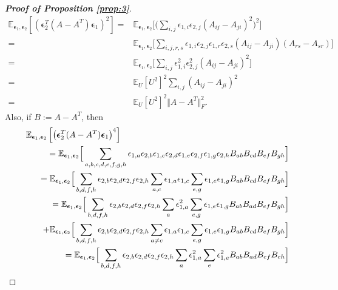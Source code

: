 \documentclass{article}
\theoremstyle{definition}
\theoremstyle{remark}
\begin{document}
	\begin{proof}[\textbf{Proof of Proposition \ref{prop:3}}]
		\begin{align*}
		\mathbb{E}_{\bm{\epsilon}_{1},\bm{\epsilon}_{2}}\left[\left(\bm{\epsilon}_{2}^{T}(A-A^{T})\bm{\epsilon}_{1}\right)^{2}\right]=&\mathbb{E}_{\bm{\epsilon}_{1},\bm{\epsilon}_{2}}\Big[\big(\sum_{i,j}{\epsilon}_{1,i}{\epsilon}_{2,j}(A_{ij}-A_{ji})^{2}\big)^{2}\Big]\\
		=&\mathbb{E}_{\bm{\epsilon}_{1},\bm{\epsilon}_{2}}\Big[\sum_{i,j,r,s}{\epsilon}_{1,i}{\epsilon}_{2,j}{\epsilon}_{1,r}{\epsilon}_{2,s}(A_{ij}-A_{ji})(A_{rs}-A_{sr})\Big]\\
		=&\mathbb{E}_{\bm{\epsilon}_{1},\bm{\epsilon}_{2}}\Big[\sum_{i,j}{\epsilon}_{1,i}^{2}{\epsilon}_{2,j}^{2}(A_{ij}-A_{ji})^{2}\Big]\\
		=&\mathbb{E}_{U}[U^{2}]^{2}\sum_{i,j}(A_{ij}-A_{ji})^{2}\\
		=&\mathbb{E}_{U}[U^{2}]^{2}\Vert A-A^{T}\Vert_{F}^{2}.
		\end{align*}
		Also, if $B:=A-A^{T}$, then
		\begin{eqnarray*}
			\lefteqn{\mathbb{E}_{\bm{\epsilon}_{1},\bm{\epsilon}_{2}}\left[\left(\bm{\epsilon}_{2}^{T}(A-A^{T})\bm{\epsilon}_{1}\right)^{4}\right]}&\\
			&&=\mathbb{E}_{\bm{\epsilon}_{1},\bm{\epsilon}_{2}}\Big[\sum_{a,b,c,d,e,f,g,h}{\epsilon}_{1,a}{\epsilon}_{2,b}{\epsilon}_{1,c}{\epsilon}_{2,d}{\epsilon}_{1,e}{\epsilon}_{2,f}{\epsilon}_{1,g}{\epsilon}_{2,h}B_{ab}B_{cd}B_{ef}B_{gh}\Big]\\
			&&=\mathbb{E}_{\bm{\epsilon}_{1},\bm{\epsilon}_{2}}\Big[\sum_{b,d,f,h}{\epsilon}_{2,b}{\epsilon}_{2,d}{\epsilon}_{2,f}{\epsilon}_{2,h}\sum_{a,c}{\epsilon}_{1,a}{\epsilon}_{1,c}\sum_{e,g}{\epsilon}_{1,e}{\epsilon}_{1,g}B_{ab}B_{cd}B_{ef}B_{gh}\Big]\\
			&&=\mathbb{E}_{\bm{\epsilon}_{1},\bm{\epsilon}_{2}}\Big[\sum_{b,d,f,h}{\epsilon}_{2,b}{\epsilon}_{2,d}{\epsilon}_{2,f}{\epsilon}_{2,h}\sum_{a}{\epsilon}_{1,a}^{2}\sum_{e,g}{\epsilon}_{1,e}{\epsilon}_{1,g}B_{ab}B_{ad}B_{ef}B_{gh}\Big]\\
			&&\quad+\mathbb{E}_{\bm{\epsilon}_{1},\bm{\epsilon}_{2}}\Big[\sum_{b,d,f,h}{\epsilon}_{2,b}{\epsilon}_{2,d}{\epsilon}_{2,f}{\epsilon}_{2,h}\sum_{a\ne c}{\epsilon}_{1,a}{\epsilon}_{1,c}\sum_{e,g}{\epsilon}_{1,e}{\epsilon}_{1,g}B_{ab}B_{cd}B_{ef}B_{gh}\Big]\\
			&&=\mathbb{E}_{\bm{\epsilon}_{1},\bm{\epsilon}_{2}}\Big[\sum_{b,d,f,h}{\epsilon}_{2,b}{\epsilon}_{2,d}{\epsilon}_{2,f}{\epsilon}_{2,h}\sum_{a}{\epsilon}_{1,a}^{2}\sum_{e}{\epsilon}_{1,e}^{2}B_{ab}B_{ad}B_{ef}B_{eh}\Big]\\

\end{eqnarray*}
\end{proof}
\end{document}
